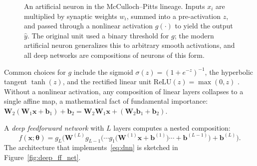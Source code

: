 \documentclass[11pt,a4paper]{report}
\newcommand{\x}{\bm{x}}
\newcommand{\bb}{\bm{b}}
\newcommand{\W}{\bm{W}}
\begin{document}
\begin{figure}[ht]
\centering
{}
\caption{An artificial neuron in the McCulloch--Pitts lineage.  Inputs $x_i$ are multiplied by synaptic weights $w_i$, summed into a pre-activation $z$, and passed through a nonlinear activation $g(\cdot)$ to yield the output $\hat{y}$.  The original \citet{mcculloch1943logical} unit used a binary threshold for $g$; the modern artificial neuron generalizes this to arbitrary smooth activations, and all deep networks are compositions of neurons of this form.}
\label{fig:artificial_neuron}
\end{figure}

Common choices for $g$ include the sigmoid $\sigma(z) = (1+e^{-z})^{-1}$, the hyperbolic tangent $\tanh(z)$, and the rectified linear unit $\mathrm{ReLU}(z) = \max(0,z)$ \citep{nair2010rectified, glorot2011deep}.  Without a nonlinear activation, any composition of linear layers collapses to a single affine map, a mathematical fact of fundamental importance: $\W_2(\W_1\x + \bb_1) + \bb_2 = \W_2\W_1\x + (\W_2\bb_1 + \bb_2)$.

A \emph{deep feedforward network} with $L$ layers computes a nested composition:
\begin{equation}
f(\x;\bm{\theta}) = g_L\!\Big(\W^{(L)} g_{L-1}\!\big(\cdots g_1\!\big(\W^{(1)}\x + \bb^{(1)}\big)\cdots + \bb^{(L-1)}\big) + \bb^{(L)}\Big).
\label{eq:dnn}
\end{equation}
The architecture that implements~\eqref{eq:dnn} is sketched in Figure~\ref{fig:deep_ff_net}.
\end{document}
